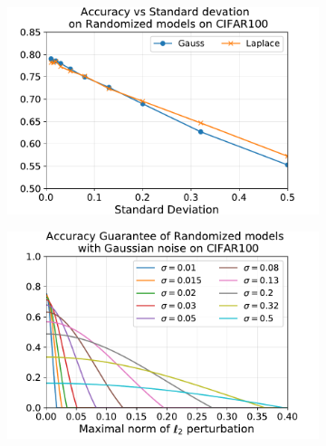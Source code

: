 \begin{figure}[htb]
  \centering
  \begin{subfigure}[t]{0.31\textwidth}
    \centering
    \includegraphics[scale=0.32]{figures/appendix/ap3-randomized_inference/acc_sd_CIFAR100.pdf}
    \caption{}
    \label{figure:ap3-acc_sd_CIFAR100-appendix}
  \end{subfigure}
  \begin{subfigure}[t]{0.31\textwidth}
    \centering
    \includegraphics[scale=0.32]{figures/appendix/ap3-randomized_inference/gauss_certif_CIFAR100.pdf}
    \caption{}
    \label{figure:ap3-gauss_certif_CIFAR100-appendix}
  \end{subfigure}
  \begin{subfigure}[t]{0.31\textwidth}
    \centering

\end{subfigure}
\end{figure}
